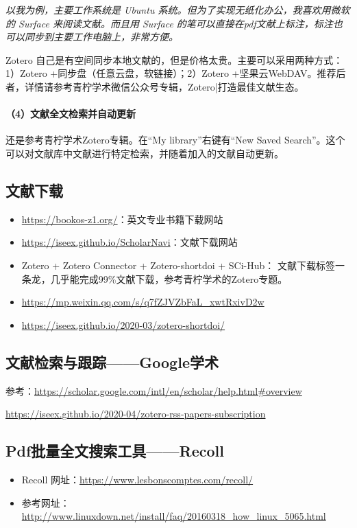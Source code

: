 \emph{以我为例，主要工作系统是 Ubuntu 系统。但为了实现无纸化办公，我喜欢用微软的 Surface 来阅读文献。而且用 Surface 的笔可以直接在pdf文献上标注，标注也可以同步到主要工作电脑上，非常方便。}

Zotero 自己是有空间同步本地文献的，但是价格太贵。主要可以采用两种方式：1）Zotero +同步盘（任意云盘，软链接）；2）Zotero +坚果云WebDAV。推荐后者，详情请参考青柠学术微信公众号专辑，Zotero|打造最佳文献生态。

\paragraph{（4）文献全文检索并自动更新}
还是参考青柠学术Zotero专辑。在“My library”右键有“New Saved Search”。这个可以对文献库中文献进行特定检索，并随着加入的文献自动更新。



\subsection{文献下载}
\begin{itemize}
\item \url{https://bookos-z1.org/}：英文专业书籍下载网站
\item \url{https://iseex.github.io/ScholarNavi}：文献下载网站
\item Zotero + Zotero Connector + Zotero-shortdoi + SCi-Hub： 文献下载标签一条龙，几乎能完成99\%文献下载，参考青柠学术的Zotero专题。
\end{itemize}

\begin{itemize}
\item \url{https://mp.weixin.qq.com/s/q7fZJVZbFaL_xwtRxivD2w}
\item \url{https://iseex.github.io/2020-03/zotero-shortdoi/}
\end{itemize}


\subsection{文献检索与跟踪——Google学术}
参考：\url{https://scholar.google.com/intl/en/scholar/help.html#overview}

\url{https://iseex.github.io/2020-04/zotero-rss-papers-subscription}



\subsection{Pdf批量全文搜索工具——Recoll}
\begin{itemize}
\item Recoll 网址：\url{https://www.lesbonscomptes.com/recoll/}

\item 参考网址：\url{http://www.linuxdown.net/install/faq/20160318_how_linux_5065.html}
\end{itemize}


